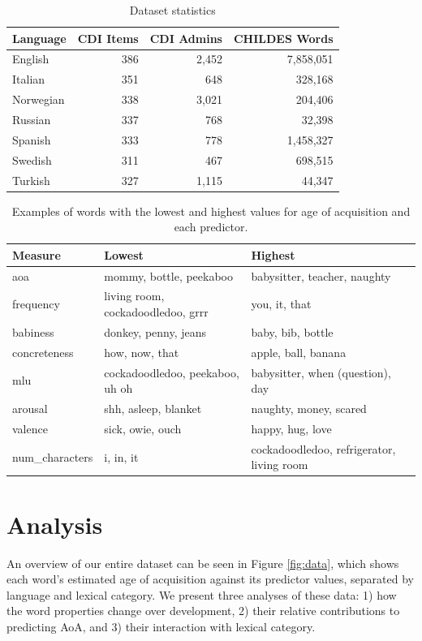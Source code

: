 \documentclass[10pt, letterpaper]{article}
\begin{document}
\begin{table}[t]
\centering
\begin{tabular}{lrrr}
  \hline
Language & CDI Items & CDI Admins & CHILDES Words \\ 
  \hline
English & 386 & 2,452 & 7,858,051 \\ 
  Italian & 351 & 648 & 328,168 \\ 
  Norwegian & 338 & 3,021 & 204,406 \\ 
  Russian & 337 & 768 & 32,398 \\ 
  Spanish & 333 & 778 & 1,458,327 \\ 
  Swedish & 311 & 467 & 698,515 \\ 
  Turkish & 327 & 1,115 & 44,347 \\ 
   \hline
\end{tabular}
\caption{Dataset statistics} 
\end{table}

\begin{table}[!hb]
\centering
\begin{tabular}{lll}
  \hline
Measure & Lowest & Highest \\ 
  \hline
aoa & mommy, bottle, peekaboo & babysitter, teacher, naughty \\ 
  frequency & living room, cockadoodledoo, grrr & you, it, that \\ 
  babiness & donkey, penny, jeans & baby, bib, bottle \\ 
  concreteness & how, now, that & apple, ball, banana \\ 
  mlu & cockadoodledoo, peekaboo, uh oh & babysitter, when (question), day \\ 
  arousal & shh, asleep, blanket & naughty, money, scared \\ 
  valence & sick, owie, ouch & happy, hug, love \\ 
  num\_characters & i, in, it & cockadoodledoo, refrigerator, living room \\ 
   \hline
\end{tabular}
\caption{Examples of words with the lowest and highest values for age of acquisition and each predictor.} 
\end{table}

\section{Analysis}\label{analysis}

An overview of our entire dataset can be seen in Figure \ref{fig:data},
which shows each word's estimated age of acquisition against its
predictor values, separated by language and lexical category. We present
three analyses of these data: 1) how the word properties change over
development, 2) their relative contributions to predicting AoA, and 3)
their interaction with lexical category.
\end{document}
